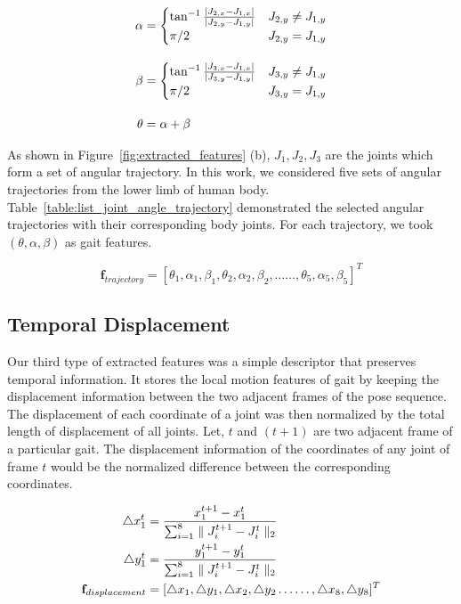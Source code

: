 \begin{equation}
	\begin{split}
	\alpha &= 
	\begin{cases}
	\tan^{-1}{\frac{|J_{2,x}-J_{1,x}|}{|J_{2,y}-J_{1,y}|}} & J_{2,y} \neq J_{1,y}\\
	\pi/2 & J_{2,y} = J_{1,y}
	\end{cases} \\ \noalign{\vskip10pt}
	\beta &= 
	\begin{cases}
	\tan^{-1}{\frac{|J_{3,x}-J_{1,x}|}{|J_{3,y}-J_{1,y}|}} & J_{3,y} \neq J_{1,y}\\
	\pi/2 & J_{3,y} = J_{1,y}
	\end{cases} \\ \noalign{\vskip10pt}
	\theta &= \alpha + \beta
	\end{split}
\end{equation}

As shown in Figure~\ref{fig:extracted_features} (b), $J_1, J_2, J_3$ are the joints which form a set of angular trajectory. In this work, we considered five sets of angular trajectories from the lower limb of human body. Table~\ref{table:list_joint_angle_trajectory} demonstrated the selected angular trajectories with their corresponding body joints. For each trajectory, we took $(\theta, \alpha, \beta)$ as gait features. 

\begin{equation}
\textbf {f}_{trajectory}= [\theta_1, \alpha_1, \beta_1,\theta_2, \alpha_2, \beta_2,\ldots\ldots, \theta_5, \alpha_5, \beta_5]^T
\end{equation}


\subsection{Temporal Displacement}
Our third type of extracted features was a simple descriptor that preserves temporal information. It stores the local motion features of gait by keeping the displacement information between the two adjacent frames of the pose sequence. The displacement of each coordinate of a joint was then normalized by the total length of displacement of all joints. Let, $ t $ and $ (t + 1) $ are two adjacent frame of a particular gait. The displacement information of the coordinates of any joint of frame $ t $ would be the normalized difference between the corresponding coordinates. 

\begin{equation}
\begin{split}
\triangle x^{t}_{1} &=\frac{x^{t+1}_{1} - x^{t}_{1}}{\sum_{i=1}^{8}\parallel J^{t+1}_{i} - J^{t}_{i}\parallel_2} \\ 
\triangle y^{t}_{1} &=\frac{y^{t+1}_{1} - y^{t}_{1}}{\sum_{i=1}^{8}\parallel J^{t+1}_{i} - J^{t}_{i}\parallel_2} \\ 
{\bf f}_{displacement} &= [\triangle x_{1}, \triangle y_{1}, \triangle x_{2}, \triangle y_{2} \ldots\ldots, \triangle x_{8}, \triangle y_{8}]^{T}
\end{split}
\end{equation}

